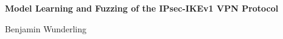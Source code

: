 %
%
% 
% 




\vspace*{2cm}


\begin{center}
\begin{spacing}{1.1}
\Huge\sffamily\bfseries
Model Learning and Fuzzing of the IPsec-IKEv1 VPN Protocol\\
\end{spacing}

\vspace{3cm}


\vspace{3cm}

{\LARGE\sffamily
Benjamin Wunderling
}
\end{center}








\cleardoublepage


\vspace*{-3cm}

